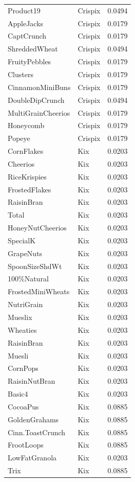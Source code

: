 \begin{table}[!htbp]
\begin{tabular}{lll}
Product19 & Crispix & 0.0494
\\
AppleJacks & Crispix & 0.0179
\\
CaptCrunch & Crispix & 0.0179
\\
ShreddedWheat & Crispix & 0.0494
\\
FruityPebbles & Crispix & 0.0179
\\
Clusters & Crispix & 0.0179
\\
CinnamonMiniBuns & Crispix & 0.0179
\\
DoubleDipCrunch & Crispix & 0.0494
\\
MultiGrainCheerios & Crispix & 0.0179
\\
Honeycomb & Crispix & 0.0179
\\
Popeye & Crispix & 0.0179
\\
CornFlakes & Kix & 0.0203
\\
Cheerios & Kix & 0.0203
\\
RiceKrispies & Kix & 0.0203
\\
FrostedFlakes & Kix & 0.0203
\\
RaisinBran & Kix & 0.0203
\\
Total & Kix & 0.0203
\\
HoneyNutCheerios & Kix & 0.0203
\\
SpecialK & Kix & 0.0203
\\
GrapeNuts & Kix & 0.0203
\\
SpoonSizeShdWt & Kix & 0.0203
\\
100\%Natural & Kix & 0.0203
\\
FrostedMiniWheats & Kix & 0.0203
\\
NutriGrain & Kix & 0.0203
\\
Mueslix & Kix & 0.0203
\\
Wheaties & Kix & 0.0203
\\
RaisinBran & Kix & 0.0203
\\
Muesli & Kix & 0.0203
\\
CornPops & Kix & 0.0203
\\
RaisinNutBran & Kix & 0.0203
\\
Basic4 & Kix & 0.0203
\\
CocoaPus & Kix & 0.0885
\\
GoldenGrahams & Kix & 0.0885
\\
Cinn.ToastCrunch & Kix & 0.0885
\\
FrootLoops & Kix & 0.0885
\\
LowFatGranola & Kix & 0.0203
\\
Trix & Kix & 0.0885
\\

\end{tabular}
\end{table}
